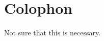 
\pagestyle{empty}

\hfill

\vfill


\section*{Colophon}

\begin{center}
Not sure that this is necessary.
\end{center}

\bigskip

\noindent\finalVersionString
